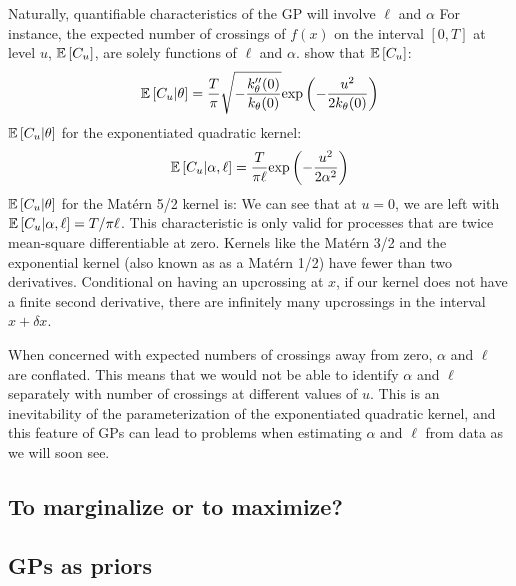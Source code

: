 \documentclass{article}
\newcommand{\Exp}[1]{\ensuremath{\mathbb{E} \lb #1 \rb}}
\newcommand{\lb}{\ensuremath{\left[}}
\newcommand{\rb}{\ensuremath{\right]}}
\begin{document}
Naturally, quantifiable characteristics of the GP will involve $\ell$ and $\alpha$ 
For instance, the expected number of crossings of $f(x)$ on the interval $[0,
T]$ at level $u$, $\Exp{C_u}$, are solely functions of $\ell$ and $\alpha$. 
\citet{cramer2004stationary} show that $\Exp{C_u}$:
\begin{align*} 
  \Exp{C_u | \theta} = \dfrac{T}{\pi} 
\sqrt{-\dfrac{k_\theta^{\prime \prime}(0)}{k_\theta(0)}}
  \text{exp}\left(-\dfrac{u^2}{2k_\theta(0)}\right)
\end{align*} 
$\Exp{C_u | \theta}$ for the exponentiated quadratic kernel:
\begin{align*} 
  \Exp{C_u | \alpha, \ell} = \dfrac{T}{\pi \ell}\text{exp}\left(-\dfrac{u^2}{2 \alpha ^ 2} \right)
\end{align*} 
$\Exp{C_u | \theta}$ for the Mat\'{e}rn 5/2 kernel is:
We can see that at $u = 0$, we are left with $\Exp{C_u | \alpha, \ell} = T /
\pi \ell$.  This characteristic is only valid for processes that are twice
mean-square differentiable at zero. Kernels like the Mat\'{e}rn 3/2 and the
exponential kernel (also known as as a Mat\'{e}rn 1/2) have fewer than two
derivatives.  Conditional on having an upcrossing at $x$, if our kernel does
not have a finite second derivative, there are infinitely many upcrossings in
the interval $x + \delta x$.

When concerned with expected numbers of crossings away from zero, $\alpha$ and
$\ell$ are conflated.  This means that we would not be able to identify
$\alpha$ and $\ell$ separately with number of crossings at different values of
$u$.  This is an inevitability of the parameterization of the exponentiated
quadratic kernel, and this feature of GPs can lead to problems when estimating
$\alpha$ and $\ell$ from data as we will soon see.

\subsection{To marginalize or to maximize?}

\subsection{GPs as priors}
\end{document}
